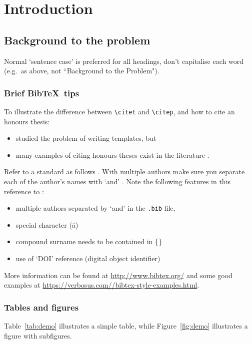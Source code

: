 \chapter{Introduction}

\section{Background to the problem}

Normal `sentence case' is preferred for all headings, don't capitalise each word (e.g.~as above, not ``Background to the Problem").

\subsection{Brief Bib\TeX\ tips}

To illustrate the difference between \verb|\citet| and \verb|\citep|, and how to cite an honours thesis:
\begin{itemize}
  \item \citet{Smith} studied the problem of writing templates, but
  \item many examples of citing honours theses exist in the literature \citep{Smith}.
\end{itemize}
Refer to a standard as follows \citep{ISO3382-2}. With multiple authors make sure you separate each of the author's names with `and' \citep{BookExample}. Note the following features in this reference to \citet{vonKarman}:
\begin{itemize}
  \item multiple authors separated by `and' in the {\tt .bib} file,
  \item special character (\'a)
  \item compound surname needs to be contained in \{\}
  \item use of `DOI' reference (digital object identifier)  
\end{itemize}

More information can be found at \url{http://www.bibtex.org/} and some good examples at \url{https://verbosus.com//bibtex-style-examples.html}.

\subsection{Tables and figures}

Table~\ref{tab:demo} illustrates a simple table, while Figure~\ref{fig:demo} illustrates a figure with subfigures.



